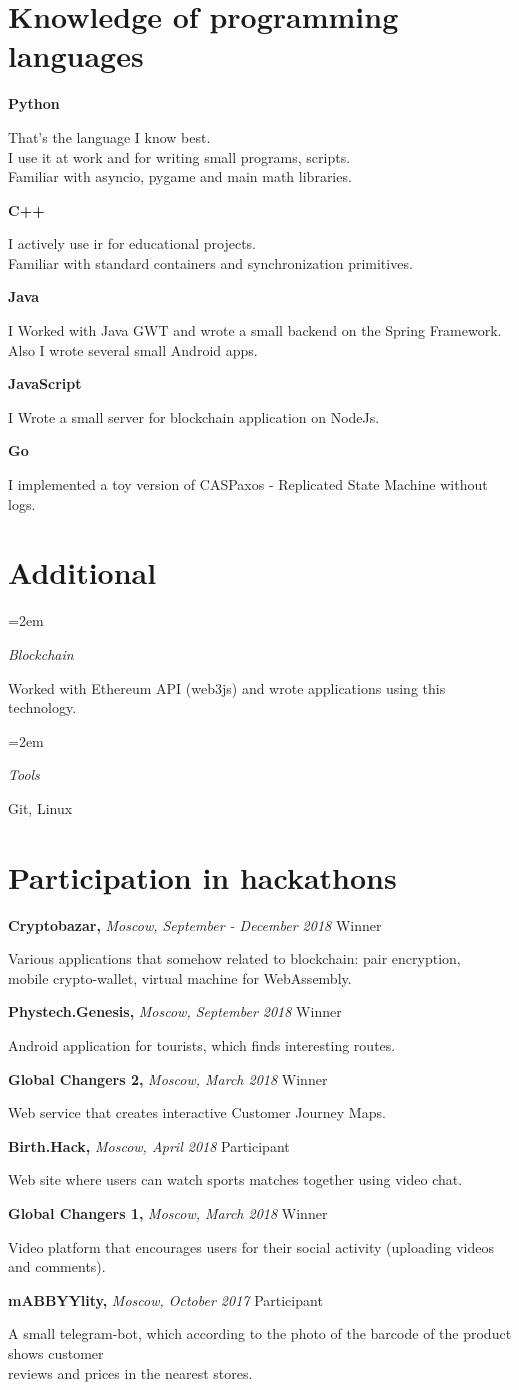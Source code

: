 \documentclass[fontsize=11pt]{article}
\newlength{\spacebox}
\newcommand{\sepspace}{\vspace*{1em}}   %
\newcommand{\NewPart}[1]{\section*{#1}}
\newcommand{\PersonalEntry}[2]{
    \noindent\hangindent=2em\hangafter=0 %
    \parbox{\spacebox}{                  %
    \textit{#1}}                      %
    \hspace{1.5em} #2 \par}              %
\newcommand{\SkillsEntry}[2]{                %
    \noindent\hangindent=2em\hangafter=0 %
    \parbox{\spacebox}{                  %
    \textit{#1}}                    %
    \hspace{1.5em} #2 \par}              %
\newcommand{\ProgrammingEntry}[2]{
    \noindent \textbf{#1} \hfill      %

    \noindent \small #2 %
    \normalsize \par}
\newcommand{\EducationEntry}[4]{
    \noindent \textbf{#1} \hfill      %
    \colorbox{Black}{
      \parbox{10em}{
      \color{White} \centering #2}} \par   %
    \noindent \textit{#3} \par        %
    \noindent\hangindent=2em\hangafter=0 \small #4 %
    \normalsize \par}
\newcommand{\AwardEntry}[4]{         %
    \noindent \textbf{#1} \noindent \textit{#3} \hfill {#2} \par
    \noindent \small #4 %
    \normalsize \par}
\begin{document}
\NewPart{Knowledge of programming languages}{}
\ProgrammingEntry
{Python \bigstar \bigstar \bigstar}
{That's the language I know best. \\
I use it at work and for writing small programs, scripts. \\
Familiar with asyncio, pygame and main math libraries.}
\bigskip
\ProgrammingEntry
{C++ \bigstar \bigstar \bigstar}
{I actively use ir for educational projects. \\ Familiar with standard containers and synchronization primitives.}
\bigskip
\ProgrammingEntry
{Java \bigstar \bigstar}
{I Worked with Java GWT and wrote a small backend on the Spring Framework. \\
Also I wrote several small Android apps.}
\bigskip
\ProgrammingEntry
{JavaScript \bigstar \bigstar}
{I Wrote a small server for blockchain application on NodeJs.}
\bigskip
\ProgrammingEntry
{Go \bigstar}
{I implemented a toy version of CASPaxos - Replicated State Machine without logs.}

\NewPart{Additional}{}
\SkillsEntry{Blockchain}{Worked with Ethereum API (web3js) and wrote applications using this technology.}
\SkillsEntry{Tools}{Git, Linux}

\NewPart{Participation in hackathons}{}

\AwardEntry{Cryptobazar, }{Winner}
{Moscow, September - December 2018}
{Various applications that somehow related to blockchain: pair encryption, \\ mobile crypto-wallet, virtual machine for WebAssembly.}
\sepspace
\AwardEntry{Phystech.Genesis,}{Winner}
{Moscow, September 2018}
{Android application for tourists, which finds interesting routes.}
\sepspace
\AwardEntry{Global Changers 2,}{Winner}
{Moscow, March 2018}
{Web service that creates interactive Customer Journey Maps.}
\sepspace
\AwardEntry{Birth.Hack,}{Participant}
{Moscow, April 2018}
{Web site where users can watch sports matches together using video chat.}
\sepspace
\AwardEntry{Global Changers 1,}{Winner}
{Moscow, March 2018}
{Video platform that encourages users for their social activity (uploading videos and comments).}
\sepspace
\AwardEntry{mABBYYlity,}{Participant}
{Moscow, October 2017}
{A small telegram-bot, which according to the photo of the barcode of the product shows customer\\ reviews and prices in the nearest stores.}
\end{document}
